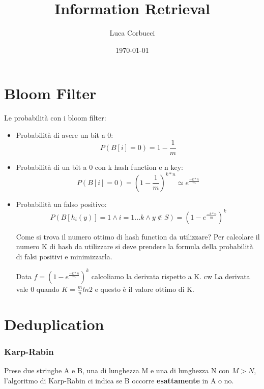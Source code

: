 \documentclass[14pt]{extreport}
\title{Information Retrieval}
\author{Luca Corbucci}
\date{\today}
\begin{document}
\maketitle

\tableofcontents

\chapter{Bloom Filter}

Le probabilità con i bloom filter:

\begin{itemize}
    \item Probabilità di avere un bit a 0:
        \begin{equation}
            P(B[i] = 0) = 1 - \frac{1}{m} 
        \end{equation}
    \item Probabilità di un bit a 0 con k hash function e n key:
        \begin{equation}
            P(B[i] = 0) = (1 - \frac{1}{m})^{k*n} \simeq e^{\frac{-k*n}{m}}
        \end{equation}
    \item Probabilità un falso positivo:
        \begin{equation}
            P(B[h_i(y)] = 1 \land i = 1...k \land y \notin S) = (1 - e^{\frac{-k*n}{m}})^{k}
        \end{equation}
    
Come si trova il numero ottimo di hash function da utilizzare?
Per calcolare il numero K di hash da utilizzare si deve prendere la formula della probabilità di falsi positivi e minimizzarla.

Data $f = (1 - e^{\frac{-k*n}{m}})^{k}$ calcoliamo la derivata rispetto a K. 
     cw
La derivata vale 0 quando $K = \frac{m}{n} ln2$ e questo è il valore ottimo di K.
\end{itemize}

\chapter{Deduplication}

\subsection{Karp-Rabin}

Prese due stringhe A e B, una di lunghezza M e una di lunghezza N con ${M > N}$, l'algoritmo di Karp-Rabin ci indica se B occorre {\bf esattamente} in A o no.
\end{document}
